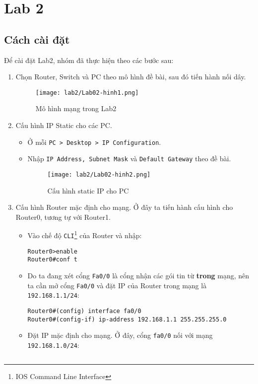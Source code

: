 \documentclass[]{article}
\begin{document}
\section{Lab 2}
\subsection{Cách cài đặt}
Để cài đặt Lab2, nhóm đã thực hiện theo các bước sau:
\begin{enumerate}
\item Chọn Router, Switch và PC theo mô hình đề bài, sau đó tiến hành nối dây.
\begin{figure}[H]
    \centering
    \texttt{[image: lab2/Lab02-hinh1.png]}
    \caption{Mô hình mạng trong Lab2}
    \label{fig:MohinhLab2}
\end{figure}
\item Cấu hình IP Static cho các PC.\label{cauhinhippc}
\begin{itemize}
    \item Ở mỗi \texttt{PC > Desktop > IP Configuration}.
    \item Nhập \texttt{IP Address, Subnet Mask} và \texttt{Default Gateway} theo đề bài.
    \begin{figure}[H]
        \centering
        \texttt{[image: lab2/Lab02-hinh2.png]}
        \caption{Cấu hình static IP cho PC}
    \end{figure}
\end{itemize}
\item Cấu hình Router mặc định cho mạng.
Ở đây ta tiến hành cấu hình cho Router0, tương tự với Router1.\label{chRouter}
\begin{itemize}
\item Vào chế độ \texttt{CLI}\footnote{IOS Command Line Interface} của Router và nhập:
\begin{lstlisting}
Router0>enable
Router0#conf t
\end{lstlisting}
\item Do ta đang xét cổng \texttt{Fa0/0} là cổng nhận các gói tin từ \textbf{trong} mạng, nên ta cần mở cổng \texttt{Fa0/0} và đặt IP của Router trong mạng là \texttt{192.168.1.1/24}:
\begin{lstlisting}
Router0#(config) interface fa0/0
Router0#(config-if) ip-address 192.168.1.1 255.255.255.0
\end{lstlisting}
\item Đặt IP mặc định cho mạng. Ở đây, cổng \texttt{fa0/0} nối với mạng \texttt{192.168.1.0/24}:
\begin{lstlisting}

\end{lstlisting}
\end{itemize}
\end{enumerate}
\end{document}
